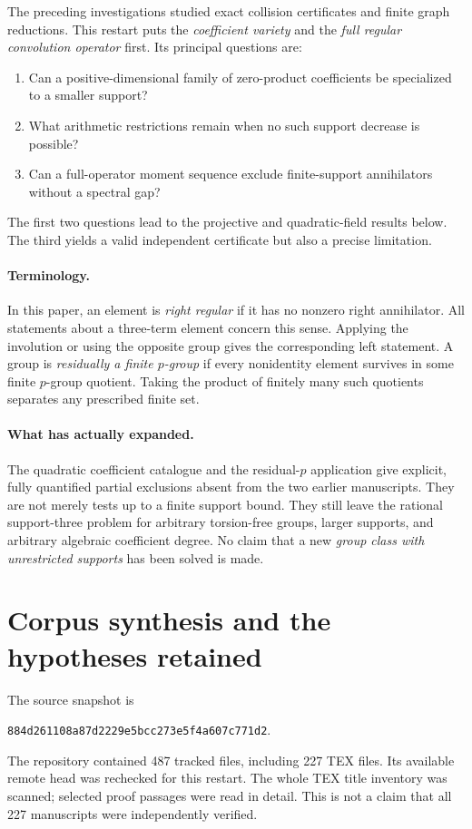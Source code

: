 \documentclass[11pt,a4paper,oneside]{report}
\theoremstyle{definition}
\theoremstyle{remark}
\begin{document}
The preceding investigations studied exact collision certificates and finite graph reductions. This restart puts the \emph{coefficient variety} and the \emph{full regular convolution operator} first. Its principal questions are:
\begin{enumerate}
\item Can a positive-dimensional family of zero-product coefficients be specialized to a smaller support?
\item What arithmetic restrictions remain when no such support decrease is possible?
\item Can a full-operator moment sequence exclude finite-support annihilators without a spectral gap?
\end{enumerate}
The first two questions lead to the projective and quadratic-field results below. The third yields a valid independent certificate but also a precise limitation.

\paragraph{Terminology.}
In this paper, an element is \emph{right regular} if it has no nonzero right annihilator. All statements about a three-term element concern this sense. Applying the involution or using the opposite group gives the corresponding left statement. A group is \emph{residually a finite \(p\)-group} if every nonidentity element survives in some finite \(p\)-group quotient. Taking the product of finitely many such quotients separates any prescribed finite set.

\paragraph{What has actually expanded.}
The quadratic coefficient catalogue and the residual-\(p\) application give explicit, fully quantified partial exclusions absent from the two earlier manuscripts. They are not merely tests up to a finite support bound. They still leave the rational support-three problem for arbitrary torsion-free groups, larger supports, and arbitrary algebraic coefficient degree. No claim that a new \emph{group class with unrestricted supports} has been solved is made.

\section{Corpus synthesis and the hypotheses retained}
The source snapshot is
\begin{center}\small\texttt{884d261108a87d2229e5bcc273e5f4a607c771d2}.\end{center}
The repository contained 487 tracked files, including 227 TEX files. Its available remote head was rechecked for this restart. The whole TEX title inventory was scanned; selected proof passages were read in detail. This is not a claim that all 227 manuscripts were independently verified.
\end{document}
